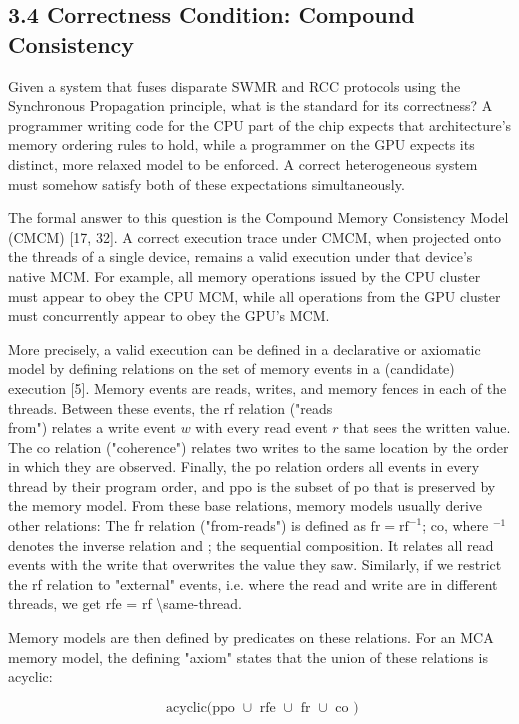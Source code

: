 \documentclass[10pt]{article}
\begin{document}
\subsection*{3.4 Correctness Condition: Compound Consistency}
Given a system that fuses disparate SWMR and RCC protocols using the Synchronous Propagation principle, what is the standard for its correctness? A programmer writing code for the CPU part of the chip expects that architecture's memory ordering rules to hold, while a programmer on the GPU expects its distinct, more relaxed model to be enforced. A correct heterogeneous system must somehow satisfy both of these expectations simultaneously.

The formal answer to this question is the Compound Memory Consistency Model (CMCM) [17, 32]. A correct execution trace under CMCM, when projected onto the threads of a single device, remains a valid execution under that device's native MCM. For example, all memory operations issued by the CPU cluster must appear to obey the CPU MCM, while all operations from the GPU cluster must concurrently appear to obey the GPU's MCM.

More precisely, a valid execution can be defined in a declarative or axiomatic model by defining relations on the set of memory events in a (candidate) execution [5]. Memory events are reads, writes, and memory fences in each of the threads. Between these events, the rf relation ("reads\\
from") relates a write event $w$ with every read event $r$ that sees the written value. The co relation ("coherence") relates two writes to the same location by the order in which they are observed. Finally, the po relation orders all events in every thread by their program order, and ppo is the subset of po that is preserved by the memory model. From these base relations, memory models usually derive other relations: The fr relation ("from-reads") is defined as $\mathrm{fr}=\mathrm{rf}^{-1}$; co, where ${ }^{-1}$ denotes the inverse relation and ; the sequential composition. It relates all read events with the write that overwrites the value they saw. Similarly, if we restrict the rf relation to "external" events, i.e. where the read and write are in different threads, we get rfe = rf \textbackslash same-thread.

Memory models are then defined by predicates on these relations. For an MCA memory model, the defining "axiom" states that the union of these relations is acyclic:


\begin{equation*}
\text { acyclic(ppo } \cup \text { rfe } \cup \text { fr } \cup \text { co }) \tag{1}
\end{equation*}
\end{document}
